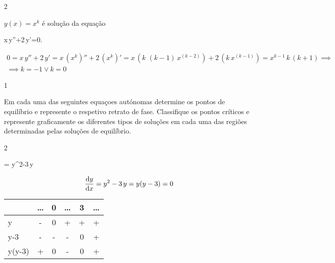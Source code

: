 \documentclass["./AM3C.exercises_resolutions.2024.tex"]{subfiles}
\begin{document}
\begin{questionBox}2{} %

  \(y(x)=x^k\) é solução da equação
  \begin{BM}
    x\,y''+2\,y'=0.
  \end{BM}

  \answer{}

  \begin{gather*}
    0
    = x\,y''+2\,y'
    = x\,(
      x^k
    )''+2\,(
      x^k
    )'
    = x\,(
      k\,\,(k-1)\,x^(k-2)
    )+2\,(
      k\,x^(k-1)
    )
    = x^{k-1}\,k\,(
      k+1
    )
    \implies \\
    \implies
    k = - 1 \lor k = 0
  \end{gather*}
\end{questionBox}

\begin{questionBox}1{} %

  Em cada uma das seguintes equaçoes autónomas determine os pontos de equilíbrio e represente o respetivo retrato de fase. Classiﬁque os pontos críticos e represente graﬁcamente os diferentes tipos de soluções em cada uma das regiões determinadas pelas soluções de equilíbrio.

\end{questionBox}

\begin{questionBox}2{} %

  \begin{BM}
    = y^2-3\,y
  \end{BM}

  \answer{}

  \begin{gather*}
    \odv{y}{x}
    = y^2-3\,y
    = y(y-3)
    = 0
  \end{gather*}
  \begin{center}
    \vspace{1ex}
    \begin{tabular}{L *5{C}}
      \toprule

      & \dots & 0 & \dots & 3 & \dots
      \\\midrule

      y
      & -     & 0 & +     & + & +
      \\ y-3
      & -     & - & -     & 0 & +
      \\\midrule
      y(y-3)
      & +     & 0 & -     & 0 & +

      \\\bottomrule
    \end{tabular}
    \vspace{2ex}
  \end{center}

\end{questionBox}
\end{document}
